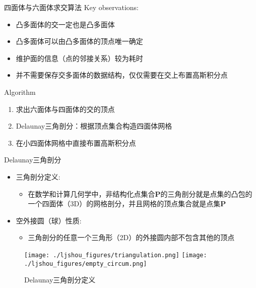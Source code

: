 \documentclass[mathserif]{beamer}
\begin{document}
\begin{CJK}{UTF8}{gkai}
\begin{frame}{四面体与六面体求交算法}
    Key observations:
                \begin{itemize}
                    \item 凸多面体的交一定也是凸多面体
                    \item 凸多面体可以由凸多面体的顶点唯一确定
                    \item 维护面的信息（点的邻接关系）较为耗时
                    \item 并不需要保存交多面体的数据结构，仅仅需要在交上布置高斯积分点
                \end{itemize}
                    
                \begin{block}{Algorithm}
                \begin{enumerate}
                    \item 求出六面体与四面体的交的顶点
                    \item Delaunay三角剖分：根据顶点集合构造四面体网格
                    \item 在小四面体网格中直接布置高斯积分点
                \end{enumerate}
                \end{block}
\end{frame}
	
\begin{frame}{Delaunay三角剖分}
    \begin{itemize}
    \item 三角剖分定义:
        \begin{itemize}
        \item 在数学和计算几何学中，非结构化点集合{\bf P}的三角剖分就是点集的凸包的一个四面体（3D）的网格剖分，并且网格的顶点集合就是点集{\bf P}
        \end{itemize}
    \item 空外接圆（球）性质:
        \begin{itemize}
        \item 三角剖分的任意一个三角形（2D）的外接圆内部不包含其他的顶点
        \end{itemize}
    \end{itemize}
    
    \begin{figure}
    \centering
    \texttt{[image: ./ljshou\_figures/triangulation.png]}
    \texttt{[image: ./ljshou\_figures/empty\_circum.png]}
    \caption{Delaunay三角剖分定义}
    \end{figure}
\end{frame}
	

\end{CJK}
\end{document}
